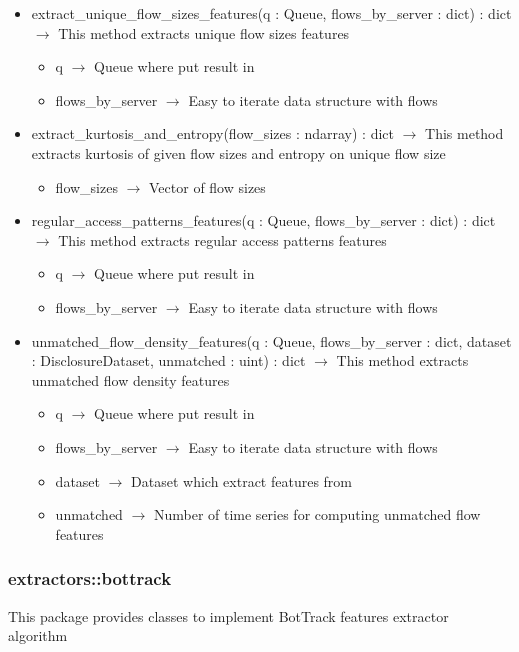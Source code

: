 \begin{description}
\begin{itemize}
\item extract\_unique\_flow\_sizes\_features(q : Queue, flows\_by\_server : dict) : dict $\rightarrow$ This method extracts unique flow sizes features\begin{itemize}
\item q $\rightarrow$ Queue where put result in
\item flows\_by\_server $\rightarrow$ Easy to iterate data structure with flows
\end{itemize}

\item extract\_kurtosis\_and\_entropy(flow\_sizes : ndarray) : dict $\rightarrow$ This method extracts kurtosis of given flow sizes and entropy on unique flow size\begin{itemize}
\item flow\_sizes $\rightarrow$ Vector of flow sizes
\end{itemize}

\item regular\_access\_patterns\_features(q : Queue, flows\_by\_server : dict) : dict $\rightarrow$ This method extracts regular access patterns features\begin{itemize}
\item q $\rightarrow$ Queue where put result in
\item flows\_by\_server $\rightarrow$ Easy to iterate data structure with flows
\end{itemize}

\item unmatched\_flow\_density\_features(q : Queue, flows\_by\_server : dict, dataset : DisclosureDataset, unmatched : uint) : dict $\rightarrow$ This method extracts unmatched flow density features\begin{itemize}
\item q $\rightarrow$ Queue where put result in
\item flows\_by\_server $\rightarrow$ Easy to iterate data structure with flows
\item dataset $\rightarrow$ Dataset which extract features from
\item unmatched $\rightarrow$ Number of time series for computing unmatched flow features
\end{itemize}

\end{itemize}

\end{description}
\subsubsection{extractors::bottrack}
This package provides classes to implement BotTrack features extractor algorithm


